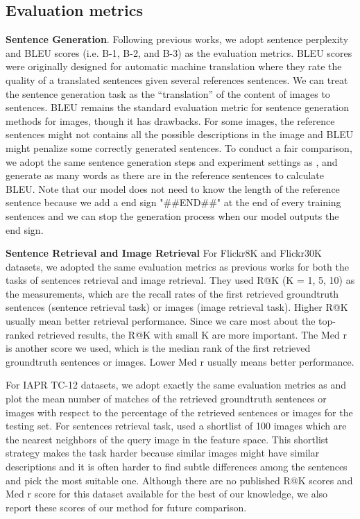 \subsection{Evaluation metrics}
\label{sec:EvaRet}

\textbf{Sentence Generation}.
Following previous works, we adopt sentence perplexity and BLEU scores (i.e. B-1, B-2, and B-3) \cite{papineni2002bleu,lin2004automatic} as the evaluation metrics.
BLEU scores were originally designed for automatic machine translation where they rate the quality of a translated sentences given several references sentences.
We can treat the sentence generation task as the ``translation'' of the content of images to sentences.
BLEU remains the standard evaluation metric for sentence generation methods for images, though it has drawbacks.
For some images, the reference sentences might not contains all the possible descriptions in the image and BLEU might penalize some correctly generated sentences. 
To conduct a fair comparison, we adopt the same sentence generation steps and experiment settings as \cite{kiros2013multimodal}, and generate as many words as there are in the reference sentences to calculate BLEU.
Note that our model does not need to know the length of the reference sentence because we add a end sign "\#\#END\#\#" at the end of every training sentences and we can stop the generation process when our model outputs the end sign.

\textbf{Sentence Retrieval and Image Retrieval}
For Flickr8K and Flickr30K datasets, we adopted the same evaluation metrics as previous works \cite{socher2014grounded,frome2013devise,karpathy2014fragment} for both the tasks of sentences retrieval and image retrieval.
They used R@K (K = 1, 5, 10) as the measurements, which are the recall rates of the first retrieved groundtruth sentences (sentence retrieval task) or images (image retrieval task).
Higher R@K usually mean better retrieval performance.
Since we care most about the top-ranked retrieved results, the R@K with small K are more important.
The Med r is another score we used, which is the median rank of the first retrieved groundtruth sentences or images.
Lower Med r usually means better performance.

For IAPR TC-12 datasets, we adopt exactly the same evaluation metrics as \cite{kiros2013multimodal} and plot the mean number of matches of the retrieved groundtruth sentences or images with respect to the percentage of the retrieved sentences or images for the testing set.
For sentences retrieval task, \cite{kiros2013multimodal} used a shortlist of 100 images which are the nearest neighbors of the query image in the feature space.
This shortlist strategy makes the task harder because similar images might have similar descriptions and it is often harder to find  subtle differences among the sentences and pick the most suitable one.
Although there are no published R@K scores and Med r score for this dataset available for the best of our knowledge, we also report these scores of our method for future comparison.

